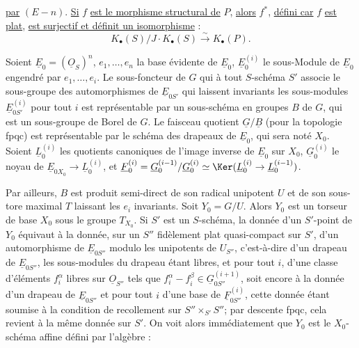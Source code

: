 
\uline{par} $(E-n)$. \uline{Si} $f$ \uline{est le morphisme structural de} $P$, \uline{alors} $f^*$, \uline{défini car} $f$ \uline{est plat}, \uline{est surjectif et définit un isomorphisme} :
\[
K_\bullet(S)/J\cdot K_\bullet(S)\xrightarrow{\sim}K_\bullet(P).
\]

Soient $\underline{E}_0=(\underline{O}_S)^n$, $e_1,\ldots,e_n$ la base évidente de $\underline{E}_0$, $\underline{E}_0^{(i)}$ le sous-Module de $\underline{E}_0$ engendré par $e_1,\ldots,e_i$. Le sous-foncteur de $G$ qui à tout $S$-schéma $S'$ associe le sous-groupe des automorphismes de $\underline{E}_{0S'}$ qui laissent invariants les sous-modules $\underline{E}_{0S'}^{(i)}$ pour tout $i$ est représentable par un sous-schéma en groupes $B$ de $G$, qui est un sous-groupe de Borel de $G$. Le faisceau quotient $\underline{G}/\underline{B}$ (pour la topologie fpqc) est représentable par le schéma des drapeaux de $\underline{E}_0$, qui sera noté $X_0$. Soient $\underline{L}_0^{(i)}$ les quotients canoniques de l'image inverse de $\underline{E}_0$ sur $X_0$, $\underline{G}_0^{(i)}$ le noyau de $\underline{E}_{0X_0}\to \underline{L}_0^{(i)}$, et $\underline{F}_0^{(i)}=\underline{G}_0^{(i-1)}/\underline{G}_0^{(i)}\simeq \Ker(\underline{L}_0^{(i)}\to \underline{L}_0^{(i-1)})$.

Par ailleurs, $B$ est produit semi-direct de son radical unipotent $U$ et de son sous-tore maximal $T$ laissant les $e_i$ invariants. Soit $Y_0=G/U$. Alors $Y_0$ est un torseur de base $X_0$ sous le groupe $T_{X_0}$. Si $S'$ est un $S$-schéma, la donnée d'un $S'$-point de $Y_0$ équivaut à la donnée, sur un $S''$ fidèlement plat quasi-compact sur $S'$, d'un automorphisme de $\underline{E}_{0S''}$ modulo les unipotents de $U_{S''}$, c'est-à-dire d'un drapeau de $\underline{E}_{0S''}$, les sous-modules du drapeau étant libres, et pour tout $i$, d'une classe d'éléments $f_i^\alpha$ libres sur $\underline{O}_{S''}$ tels que $f_i^\alpha-f_i^\beta\in \underline{G}_{0S''}^{(i+1)}$, soit encore à la donnée d'un drapeau de $\underline{E}_{0S''}$ et pour tout $i$ d'une base de $\underline{F}_{0S''}^{(i)}$, cette donnée étant soumise à la condition de recollement sur $S''\times_{S'}S''$; par descente fpqc, cela revient à la même donnée sur $S'$. On voit alors immédiatement que $Y_0$ est le $X_0$-schéma affine défini par l'algèbre :

